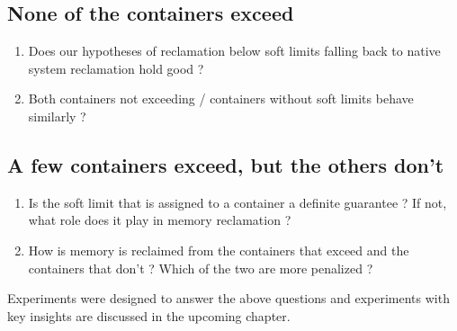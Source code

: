   \subsection{None of the containers exceed}
  
    \begin{enumerate}
      \item Does our hypotheses of reclamation below soft limits falling back to native system reclamation hold good ?
      \item Both containers not exceeding / containers without soft limits behave similarly ? 
    \end{enumerate}
  
  \subsection{A few containers exceed, but the others don’t}
  
    \begin{enumerate}
      \item Is the soft limit that is assigned to a container a definite guarantee ? If not, what role does it play in memory reclamation ?
      \item How is memory is reclaimed from the containers that exceed and the containers that don’t ? Which of the two are more penalized ?
    \end{enumerate}
    
  Experiments were designed to answer the above questions and experiments with key insights are discussed in the upcoming chapter.


	